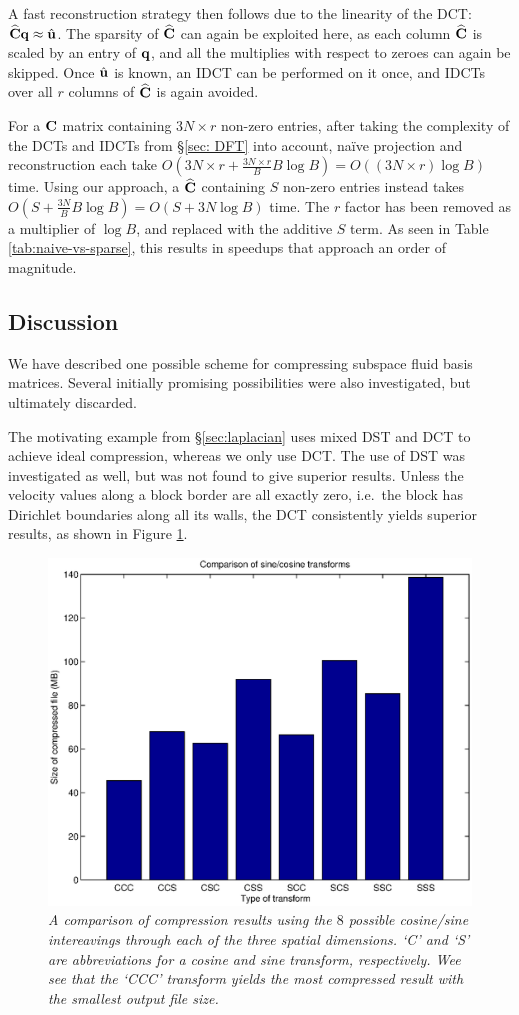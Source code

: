 A fast reconstruction strategy then follows due to the linearity of the DCT: $\widehat{\mathbf{C}}\mathbf{q} \approx \hat{\mathbf{u}}$. The sparsity of $\widehat{\mathbf{C}}$ can again be exploited here, as each column $\widehat{\mathbf{C}}$ is scaled by an entry of $\mathbf{q}$, and all the multiplies with respect to zeroes can again be skipped. Once $\hat{\mathbf{u}}$ is known, an IDCT can be performed on it once, and IDCTs over all $r$ columns of $\widehat{\mathbf{C}}$ is again avoided.

For a $\mathbf{C}$ matrix containing ${3N \times r}$ non-zero entries, after taking the complexity of the DCTs and IDCTs from \S\ref{sec: DFT} into account, na\"{i}ve projection and reconstruction each take $O\left(3N \times r +\frac{3N \times r}{B} B \log B\right) = O\left((3N \times r)\log B\right)$ time. Using our approach, a $\widehat{\mathbf{C}}$ containing $S$ non-zero entries instead takes $O\left(S + \frac{3N}{B} B \log B\right) = O\left(S + 3N \log B\right)$ time. The $r$ factor has been removed as a multiplier of $\log B$, and replaced with the additive $S$ term. As seen in Table \ref{tab:naive-vs-sparse}, this results in speedups that approach an order of magnitude.

\subsection{Discussion}

We have described one possible scheme for compressing subspace fluid basis matrices. Several initially promising possibilities were also investigated, but ultimately discarded.

The motivating example from \S\ref{sec:laplacian} uses mixed DST and DCT to achieve ideal compression, whereas we only use DCT. The use of DST was investigated as well, but was not found to give superior results. Unless the velocity values along a block border are all exactly zero, i.e.~the block has Dirichlet boundaries along all its walls, the DCT consistently yields superior results, as shown in Figure \ref{fig:interleaved}.

\begin{figure}
	\centering
	\includegraphics[height=0.5\textwidth]{chap4/figures/transform_comparison.eps}
	\caption{\em A comparison of compression results using the $8$ possible cosine/sine intereavings through each of the three spatial dimensions. `C' and `S' are abbreviations for a cosine and sine transform,
	respectively. Wee see that the `CCC' transform yields the most compressed result with the smallest output file size.}
	\label{fig:interleaved}
\end{figure}

